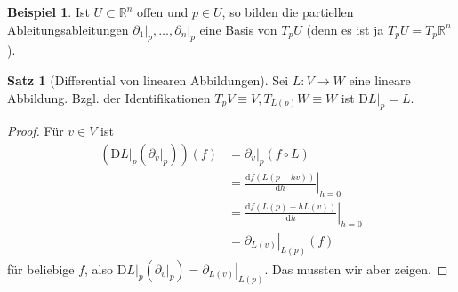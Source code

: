 \documentclass[a4paper]{scrreprt}
\numberwithin{equation}{chapter}
\newcommand{\D}{\mathrm{d}}
\newcommand{\DD}{\mathrm{D}}
\theoremstyle{definition}
\newtheorem{satz}[defn]{Satz}
\newtheorem{bsp}[defn]{Beispiel}
\begin{document}
\begin{bsp}
	Ist $U\subset\mathbb R^n$ offen und $p\in U$, so bilden die partiellen Ableitungsableitungen $\left.\partial_1\right|_p, \dots, \left.\partial_n\right|_p$ eine Basis von $T_pU$ (denn es ist ja $T_pU = T_p\mathbb R^n$).
\end{bsp}

\begin{satz}[Differential von linearen Abbildungen]
	Sei $L\colon V \to W$ eine lineare Abbildung. Bzgl. der Identifikationen $T_pV \equiv V, T_{L(p)}W \equiv W$ ist $\left.\DD L\right|_p = L$.

	\begin{center}
	\end{center}

	\begin{proof}
		Für $v\in V$ ist
		\begin{align*}
			\left(\left.\DD L\right|_p \left( \left.\partial_v\right|_p \right)\right) (f) &= \left.\partial_v\right|_p (f \circ L)\\
			&= \left.\frac{\D f(L(p + h v))}{\D h}\right|_{h=0}\\
			&= \left.\frac{\D f(L(p) + h L(v))}{\D h}\right|_{h=0}\\
			&= \left.\partial_{L(v)}\right|_{L(p)} (f)
		\end{align*}
		für beliebige $f$, also $\left.\DD L\right|_p \left( \left.\partial_v\right|_p \right) = \left.\partial_{L(v)}\right|_{L(p)}$.
		Das mussten wir aber zeigen.
	\end{proof}
\end{satz}
\end{document}
